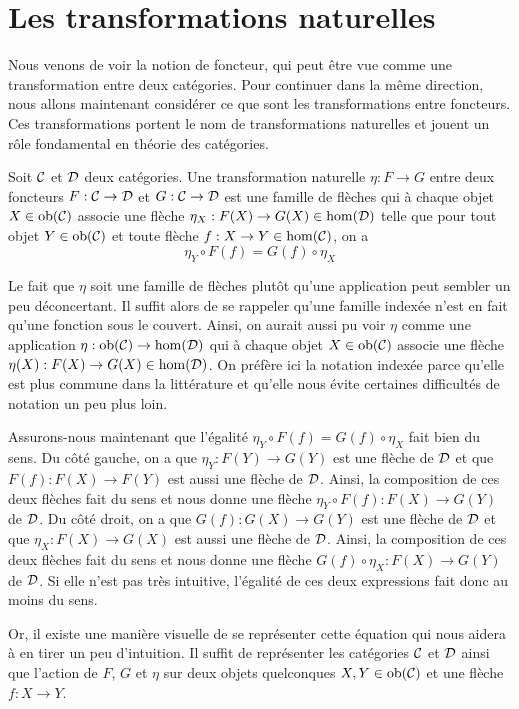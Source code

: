 \section{Les transformations naturelles}
Nous venons de voir la notion de foncteur, qui peut être vue comme une
transformation entre deux catégories. Pour continuer dans la même direction,
nous allons maintenant considérer ce que sont les transformations entre
foncteurs. Ces transformations portent le nom de transformations naturelles
et jouent un rôle fondamental en théorie des catégories.

\begin{définition}
    Soit $\mathcal{C}$ et $\mathcal{D}$ deux catégories. Une transformation naturelle
    $\eta : F \to G$ entre deux foncteurs $F : \mathcal{C} \to \mathcal{D}$ et $G : \mathcal{C} \to \mathcal{D}$
    est une famille de flèches qui à chaque objet $X \in \mathrm{ob}(\mathcal{C})$ associe une
    flèche $\eta_X : F(X) \to G(X) \in \hom(\mathcal{D})$ telle que pour tout objet
    $Y \in \mathrm{ob}(\mathcal{C})$ et toute flèche $f : X \to Y \in \hom(\mathcal{C})$, on a
    \[
        \eta_Y \circ F(f) = G(f) \circ \eta_X
    \]
\end{définition}

Le fait que $\eta$ soit une famille de flèches plutôt qu'une application
peut sembler un peu déconcertant. Il suffit alors de se rappeler qu'une
famille indexée n'est en fait qu'une fonction sous le couvert. Ainsi, on
aurait aussi pu voir $\eta$ comme une application $\eta : \mathrm{ob}(\mathcal{C}) \to \hom(\mathcal{D})$
qui à chaque objet $X \in \mathrm{ob}(\mathcal{C})$ associe une flèche
$\eta(X) : F(X) \to G(X) \in \hom(\mathcal{D})$. On préfère ici la notation indexée
parce qu'elle est plus commune dans la littérature et qu'elle nous évite
certaines difficultés de notation un peu plus loin.

Assurons-nous maintenant que l'égalité $\eta_Y \circ F(f) = G(f) \circ \eta_X$
fait bien du sens. Du côté gauche, on a que $\eta_Y : F(Y) \to G(Y)$ est une
flèche de $\mathcal{D}$ et que $F(f) : F(X) \to F(Y)$ est aussi une flèche de $\mathcal{D}$.
Ainsi, la composition de ces deux flèches fait du sens et nous donne une flèche
$\eta_Y \circ F(f) : F(X) \to G(Y)$ de $\mathcal{D}$. Du côté droit, on a que
$G(f) : G(X) \to G(Y)$ est une flèche de $\mathcal{D}$ et que $\eta_X : F(X) \to G(X)$
est aussi une flèche de $\mathcal{D}$. Ainsi, la composition de ces deux flèches fait
du sens et nous donne une flèche $G(f) \circ \eta_X : F(X) \to G(Y)$ de $\mathcal{D}$.
Si elle n'est pas très intuitive, l'égalité de ces deux expressions fait donc
au moins du sens.

Or, il existe une manière visuelle de se représenter cette équation qui nous
aidera à en tirer un peu d'intuition. Il suffit de représenter les catégories
$\mathcal{C}$ et $\mathcal{D}$ ainsi que l'action de $F$, $G$ et $\eta$ sur deux objets
quelconques $X,Y \in \mathrm{ob}(\mathcal{C})$ et une flèche $f : X \to Y$.

